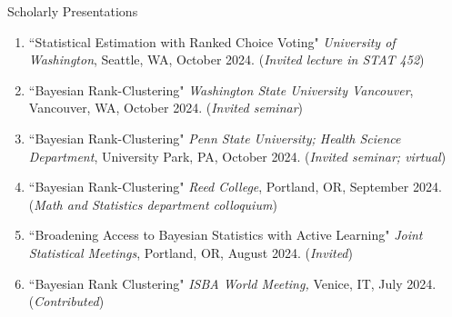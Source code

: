 \documentclass{resume} %
\begin{document}
\begin{rSection}{Scholarly Presentations}

\begin{enumerate}
\item ``Statistical Estimation with Ranked Choice Voting" \textit{University of Washington}, Seattle, WA, October 2024. (\textit{Invited lecture in STAT 452})
\item ``Bayesian Rank-Clustering" \textit{Washington State University Vancouver}, Vancouver, WA, October 2024. (\textit{Invited seminar})
\item ``Bayesian Rank-Clustering" \textit{Penn State University; Health Science Department}, University Park, PA, October 2024. (\textit{Invited seminar; virtual})
\item ``Bayesian Rank-Clustering" \textit{Reed College}, Portland, OR, September 2024. (\textit{Math and Statistics department colloquium})
\item ``Broadening Access to Bayesian Statistics with Active Learning" \textit{Joint Statistical Meetings}, Portland, OR, August 2024. (\textit{Invited})
\item ``Bayesian Rank Clustering" \textit{ISBA World Meeting,} Venice, IT, July 2024. (\textit{Contributed})


\end{enumerate}
\end{rSection}
\end{document}

